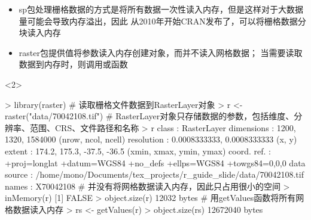 \begin{frame}[t,fragile]{\subsecname}{\subsubsecname}
\begin{itemize}
\item<1-> sp包处理栅格数据的方式是将所有数据一次性读入内存，但是这样对于大数据量可能会导致内存溢出，因此
从2010年开始CRAN发布了，可以将栅格数据分块读入内存
\item<2-> raster包提供值将参数读入内存创建对象，而并不读入网格数据；
当需要读取数据到内存时，则调用或函数

\end{itemize}

\begin{overlayarea}{\textwidth}{\textheight}
\begin{onlyenv}<2>
\begin{rcode}
> library(raster)
# 读取栅格文件数据到RasterLayer对象
> r <- raster("data/70042108.tif")
# RasterLayer对象只存储数据的参数，包括维度、分辨率、范围、CRS、文件路径和名称
> r
class       : RasterLayer 
dimensions  : 1200, 1320, 1584000  (nrow, ncol, ncell)
resolution  : 0.0008333333, 0.0008333333  (x, y)
extent      : 174.2, 175.3, -37.5, -36.5  (xmin, xmax, ymin, ymax)
coord. ref. : +proj=longlat +datum=WGS84 +no_defs +ellps=WGS84 +towgs84=0,0,0 
data source : /home/mono/Documents/tex_projects/r_guide_slide/data/70042108.tif 
names       : X70042108
# 并没有将网格数据读入内存，因此只占用很小的空间
> inMemory(r)
[1] FALSE
> object.size(r)
12032 bytes
# 用getValues函数将所有网格数据读入内存
> rs <- getValues(r)
> object.size(rs)
12672040 bytes
\end{rcode}
\end{onlyenv}
\end{overlayarea}
\end{frame}

